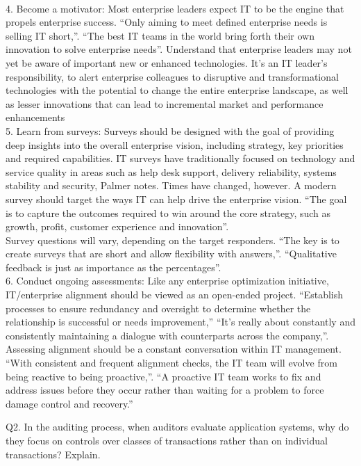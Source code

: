 \documentclass[12pt]{article}
\begin{document}
\\
4. Become a motivator: Most enterprise leaders expect IT to be the engine that propels enterprise success. “Only aiming to meet defined enterprise needs is selling IT short,”. “The best IT teams in the world bring forth their own innovation to solve enterprise needs”. Understand that enterprise leaders may not yet be aware of important new or enhanced technologies. It’s an IT leader’s responsibility, to alert enterprise colleagues to disruptive and transformational technologies with the potential to change the entire enterprise landscape, as well as lesser innovations that can lead to incremental market and performance enhancements
\\
5. Learn from surveys: Surveys should be designed with the goal of providing deep insights into the overall enterprise vision, including strategy, key priorities and required capabilities. IT surveys have traditionally focused on technology and service quality in areas such as help desk support, delivery reliability, systems stability and security, Palmer notes. Times have changed, however. A modern survey should target the ways IT can help drive the enterprise vision. “The goal is to capture the outcomes required to win around the core strategy, such as growth, profit, customer experience and innovation”.
\\
Survey questions will vary, depending on the target responders. “The key is to create surveys that are short and allow flexibility with answers,”. “Qualitative feedback is just as importance as the percentages”.
\\
6. Conduct ongoing assessments: Like any enterprise optimization initiative, IT/enterprise alignment should be viewed as an open-ended project. “Establish processes to ensure redundancy and oversight to determine whether the relationship is successful or needs improvement,” “It’s really about constantly and consistently maintaining a dialogue with counterparts across the company,”. Assessing alignment should be a constant conversation within IT management. “With consistent and frequent alignment checks, the IT team will evolve from being reactive to being proactive,”. “A proactive IT team works to fix and address issues before they occur rather than waiting for a problem to force damage control and recovery.”
\par
Q2. In the auditing process, when auditors evaluate application systems, why do they focus on controls over classes of transactions rather than on individual transactions? Explain.
\par
\end{document}
